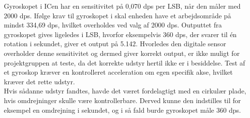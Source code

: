 Gyroskopet i ICen har en sensitivitet på 0,070 dps per LSB, når den måler med 2000 dps. Ifølge krav til gyroskopet i  skal enheden have et arbejdsområde på mindst 334,69 dps, hvilket overholdes ved valg af 2000 dps. Outputtet fra gyroskopet gives ligeledes i LSB, hvorfor eksempelvis 360 dps, der svarer til én rotation i sekundet, giver et output på 5.142. Hvorledes den digitale sensor overholder denne sensitivitet og dermed giver korrekt output, er ikke muligt for projektgruppen at teste, da det korrekte udstyr hertil ikke er i besiddelse. Test af et gyroskop kræver en kontrolleret acceleration om egen specifik akse, hvilket kræver det rette udstyr.\\
Hvis sådanne udstyr fandtes, havde det været fordelagtigt med en cirkulær plade, hvis omdrejninger skulle være kontrollerbare. Derved kunne den indstilles til for eksempel en omdrejning i sekundet, og i så fald burde gyroskopet måle 360 dps.
%
%
%
